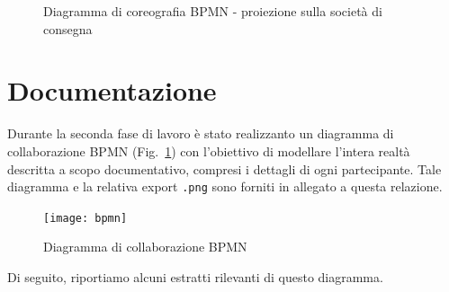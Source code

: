\documentclass[11pt]{article} %
\begin{document}
\begin{figure}[!ht]
\begin{center}
\caption{Diagramma di coreografia BPMN - proiezione sulla società di consegna}
\end{center}
\end{figure}


\clearpage

\section{Documentazione}
\label{sez:documentazione}

Durante la seconda fase di lavoro è stato realizzanto un diagramma di collaborazione BPMN (Fig.~\ref{bpmn}) con l'obiettivo di modellare l'intera realtà descritta a scopo documentativo, compresi i dettagli di ogni partecipante. Tale diagramma e la relativa export \verb|.png| sono forniti in allegato a questa relazione.

\begin{figure}[!ht]
\texttt{[image: bpmn]}
\caption{Diagramma di collaborazione BPMN}
\label{bpmn}
\end{figure}

Di seguito, riportiamo alcuni estratti rilevanti di questo diagramma.
\end{document}
